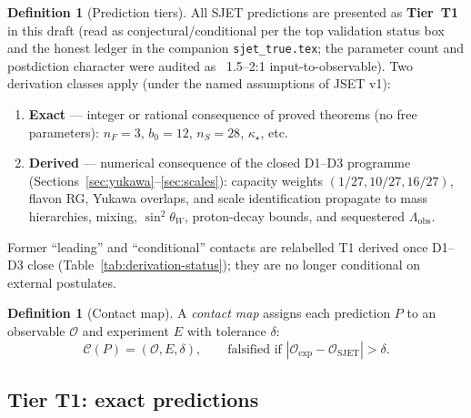 \documentclass[aps,prd,onecolumn,amsmath,amssymb,nofootinbib,11pt]{revtex4-2}
\numberwithin{equation}{section}
\theoremstyle{plain}
\theoremstyle{definition}
\newtheorem{definition}[theorem]{Definition}
\theoremstyle{remark}
\begin{document}
\begin{definition}[Prediction tiers]\label{def:prediction-tiers}
All SJET predictions are presented as \textbf{Tier~T1} in this draft (read as conjectural/conditional per the top validation status box and the honest ledger in the companion \texttt{sjet_true.tex}; the parameter count and postdiction character were audited as ~1.5--2:1 input-to-observable). Two derivation classes apply (under the named assumptions of JSET v1):
\begin{enumerate}[label=\textbf{T1 (\alph*).},leftmargin=*]
  \item \textbf{Exact} --- integer or rational consequence of proved theorems
    (no free parameters): $n_F=3$, $b_0=12$, $n_S=28$, $\kappa_\star$, etc.
  \item \textbf{Derived} --- numerical consequence of the closed D1--D3
    programme (Sections~\ref{sec:yukawa}--\ref{sec:scales}): capacity weights
    $(1/27,10/27,16/27)$, flavon RG, Yukawa overlaps, and scale
    identification propagate to mass hierarchies, mixing, $\sin^2\theta_W$,
    proton-decay bounds, and sequestered $\Lambda_{\mathrm{obs}}$.
\end{enumerate}
Former ``leading'' and ``conditional'' contacts are relabelled T1 derived once
D1--D3 close (Table~\ref{tab:derivation-status}); they are no longer
conditional on external postulates.
\end{definition}

\begin{definition}[Contact map]\label{def:contact-map}
A \emph{contact map} assigns each prediction $P$ to an observable $\mathcal{O}$
and experiment $E$ with tolerance $\delta$:
\begin{equation}\label{eq:contact}
  \mathcal{C}(P)=(\mathcal{O},E,\delta),
  \qquad
  \text{falsified if }|\mathcal{O}_{\mathrm{exp}}-\mathcal{O}_{\mathrm{SJET}}|>\delta.
\end{equation}
\end{definition}

\subsection{Tier T1: exact predictions}
\label{sec:predictions:T1}
\end{document}
